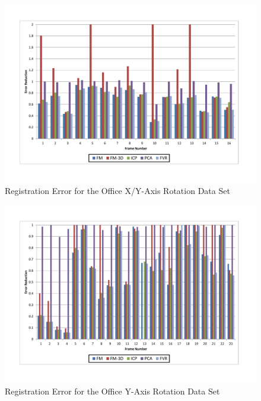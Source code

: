 \begin{figure}[t]
\centering
\includegraphics[width=6.0in]{images/results/Office_Texture_Rotate_XAxis}
\caption{Registration Error for the Office X/Y-Axis Rotation Data Set}
\label{fig:PET10}
\end{figure}

\begin{figure}[t]
\centering
\includegraphics[width=6.0in]{images/results/Office_Texture_Rotation}
\caption{Registration Error for the Office Y-Axis Rotation Data Set}
\label{fig:PET11}
\end{figure}

